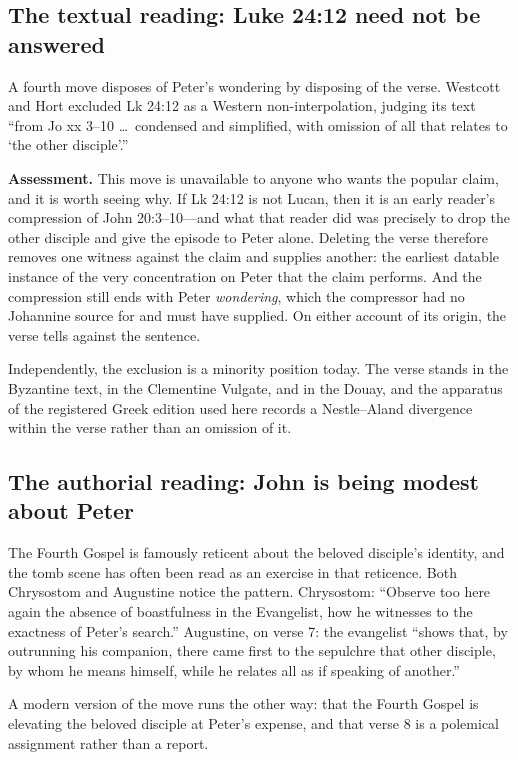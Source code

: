 \subsection{The textual reading: Luke 24:12 need not be answered}

A fourth move disposes of Peter's wondering by disposing of the verse. Westcott
and Hort excluded Lk 24:12 as a Western non-interpolation, judging its text
``from Jo xx 3--10 \ldots\ condensed and simplified, with omission of all that
relates to `the other disciple'.''

\textbf{Assessment.} This move is unavailable to anyone who wants the popular
claim, and it is worth seeing why. If Lk 24:12 is not Lucan, then it is an
early reader's compression of John 20:3--10---and what that reader did was
precisely to drop the other disciple and give the episode to Peter alone.
Deleting the verse therefore removes one witness against the claim and supplies
another: the earliest datable instance of the very concentration on Peter that
the claim performs. And the compression still ends with Peter \emph{wondering},
which the compressor had no Johannine source for and must have supplied. On
either account of its origin, the verse tells against the sentence.

Independently, the exclusion is a minority position today. The verse stands in
the Byzantine text, in the Clementine Vulgate, and in the Douay, and the
apparatus of the registered Greek edition used here records a Nestle--Aland
divergence within the verse rather than an omission of it.

\subsection{The authorial reading: John is being modest about Peter}

The Fourth Gospel is famously reticent about the beloved disciple's identity,
and the tomb scene has often been read as an exercise in that reticence. Both
Chrysostom and Augustine notice the pattern. Chrysostom: ``Observe too here
again the absence of boastfulness in the Evangelist, how he witnesses to the
exactness of Peter's search.'' Augustine, on verse 7: the evangelist ``shows
that, by outrunning his companion, there came first to the sepulchre that other
disciple, by whom he means himself, while he relates all as if speaking of
another.''

A modern version of the move runs the other way: that the Fourth Gospel is
elevating the beloved disciple at Peter's expense, and that verse 8 is a
polemical assignment rather than a report.


